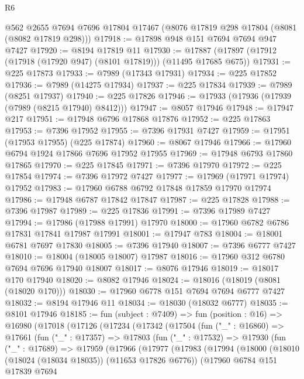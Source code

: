 \begin{lexlean}{R6}
\begin{coremodule}
    @562
    @2655
    @7694
    @7696
    @17804
    @17467
    (@8076 @17819 @298 @17804 (@8081 (@8082 @17819 @298)))
@17918 := @17898 @948 @151 @7694 @7694 @947 @7427
@17920 := @8194 @17819 @11
@17930 := @17887 (@17897 (@17912 (@17918 (@17920 @947) (@8101 @17819))) (@11495 @17685 @675))
@17931 := @225 @17873
@17933 := @7989 (@17343 @17931)
@17934 := @225 @17852
@17936 := @7989 (@14275 @17934)
@17937 := @225 @17834
@17939 := @7989 (@8251 @17937)
@17940 := @225 @17826
@17946 := @17933 (@17936 (@17939 (@7989 (@8215 @17940) @8412)))
@17947 := @8057 @17946
@17948 := @17947 @217
@17951 := @17948 @6796 @17868 @17876
@17952 := @225 @17863
@17953 := @7396 @17952
@17955 := @7396 @17931 @7427
@17959 := @17951 (@17953 @17955) (@225 @17874)
@17960 := @8067 @17946
@17966 := @17960 @6794 @1924 @17866 @7696 @17952 @17955
@17969 := @17948 @6793 @17860 @17865
@17970 := @225 @17845
@17971 := @7396 @17970
@17972 := @225 @17854
@17974 := @7396 @17972 @7427
@17977 := @17969 (@17971 @17974) @17952
@17983 := @17960 @6788 @6792 @17848 @17859 @17970 @17974
@17986 := @17948 @6787 @17842 @17847
@17987 := @225 @17828
@17988 := @7396 @17987
@17989 := @225 @17836
@17991 := @7396 @17989 @7427
@17994 := @17986 (@17988 @17991) @17970
@18000 := @17960 @6782 @6786 @17831 @17841 @17987 @17991
@18001 := @17947 @783
@18004 := @18001 @6781 @7697 @17830
@18005 := @7396 @17940
@18007 := @7396 @6777 @7427
@18010 := @18004 (@18005 @18007) @17987
@18016 := @17960 @312 @6780 @7694 @7696 @17940 @18007
@18017 := @8076 @17946
@18019 := @18017 @170 @17940
@18020 := @8082 @17946
@18024 := @18016 (@18019 (@8081 (@18020 @170)))
@18030 := @17960 @6778 @151 @7694 @7694 @6777 @7427
@18032 := @8194 @17946 @11
@18034 := @18030 (@18032 @6777)
@18035 := @8101 @17946
@18185 := fun (subject : @7409) =>
  fun (position : @16) =>
  @16980
    (@17018
      (@17126
        (@17234
          (@17342
            (@17504
              (fun ("_" : @16860) =>
              @17661
                (fun ("_" : @17357) =>
                @17803
                  (fun ("_" : @17532) =>
                  @17930
                    (fun ("_" : @17689) =>
                    @17959
                      (@17966
                        (@17977
                          (@17983
                            (@17994
                              (@18000
                                (@18010 (@18024 (@18034 @18035)) (@11653 @17826 @6776))
                                (@17960
                                  @6784
                                  @151
                                  @17839
                                  @7694

\end{coremodule}
\end{lexlean}
